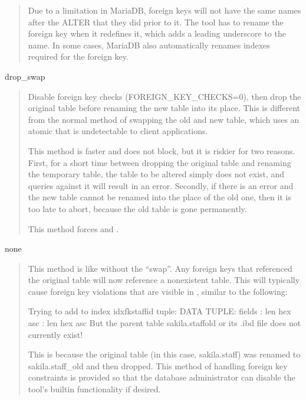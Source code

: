 \documentclass[letterpaper,10pt,english]{sphinxmanual}
\begin{document}
\begin{fulllineitems}
\begin{quote}
Due to a limitation in MariaDB, foreign keys will not have the same names after
the ALTER that they did prior to it. The tool has to rename the foreign key
when it redefines it, which adds a leading underscore to the name. In some
cases, MariaDB also automatically renames indexes required for the foreign key.
\end{quote}

drop\_swap
\begin{quote}

Disable foreign key checks (FOREIGN\_KEY\_CHECKS=0), then drop the original table
before renaming the new table into its place. This is different from the normal
method of swapping the old and new table, which uses an atomic  that is
undetectable to client applications.

This method is faster and does not block, but it is riskier for two reasons.
First, for a short time between dropping the original table and renaming the
temporary table, the table to be altered simply does not exist, and queries
against it will result in an error.  Secondly, if there is an error and the new
table cannot be renamed into the place of the old one, then it is too late to
abort, because the old table is gone permanently.

This method forces  and .
\end{quote}

none
\begin{quote}

This method is like  without the “swap”.  Any foreign keys that
referenced the original table will now reference a nonexistent table. This will
typically cause foreign key violations that are visible in , similar to the following:

\begin{sphinxVerbatim}[commandchars=\\\{\}]
Trying to add to index idx\PYGZus{}fk\PYGZus{}staff\PYGZus{}id tuple:
DATA TUPLE:  fields
: len  hex  asc  
: len  hex  asc     
But the parent table sakila.staff\PYGZus{}old
or its .ibd file does not currently exist!
\end{sphinxVerbatim}

This is because the original table (in this case, sakila.staff) was renamed to
sakila.staff\_old and then dropped. This method of handling foreign key
constraints is provided so that the database administrator can disable the
tool’s built\sphinxhyphen{}in functionality if desired.
\end{quote}

\end{fulllineitems}
\end{document}
